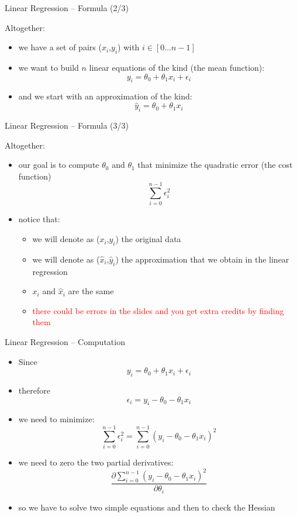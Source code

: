 \documentclass{beamer}
\begin{document}
\begin{frame}
{\centerline{Linear Regression -- Formula (2/3)}}
Altogether:
\begin{itemize}
\item we have a set of pairs ($x_i$,$y_i$)  with $i \in [0 \ldots{} n-1]$
\item we want to build $n$ linear equations of the kind (the mean function):
$$ y_i = \theta_0 + \theta_1 x_i + \epsilon_i $$
\item and we start with an approximation of the kind:
$$ \hat{y}_i = \theta_0 + \theta_1 x_i  $$
\end{itemize}

\end{frame}

\begin{frame}
{\centerline{Linear Regression -- Formula (3/3)}}
Altogether:
\begin{itemize}
\item our goal is to compute  $\theta_0$ and $\theta_1$ that minimize the quadratic error (the cost function)
$$ \sum_{i=0}^{n-1}\epsilon_i^2  $$

\item notice that:
\begin{itemize}
\item we will denote as ($x_i$,$y_i$) the original data
\item we will denote as ($\hat{x}_i$,$\hat{y}_i$) the approximation that we obtain in the linear regression
\item $x_i$ and $\hat{x}_i$ are the same
\item \textcolor{red}{there could be errors in the slides and you get extra credits by finding them}
\end{itemize}
\end{itemize}

\end{frame}


\begin{frame}
{\centerline{Linear Regression -- Computation}}
\begin{itemize}
\item Since 
$$ y_i = \theta_0 + \theta_1 x_i + \epsilon_i $$
\item therefore
$$\epsilon_i  = y_i - \theta_0 - \theta_1 x_i $$
\item we need to minimize:
$$ \sum_{i=0}^{n-1}\epsilon_i^2  = \sum_{i=0}^{n-1}(y_i - \theta_0 - \theta_1 x_i)^2  $$
\item we need to zero the two partial derivatives:
$$ \frac{\partial \sum_{i=0}^{n-1}(y_i - \theta_0 - \theta_1 x_i)^2}{\partial \theta_i}$$
\item so we have to solve two simple equations and then to check the Hessian
\end{itemize}

\end{frame}
\end{document}
